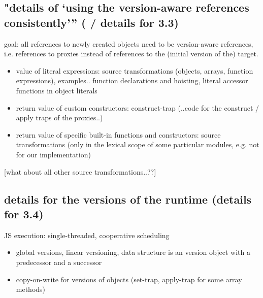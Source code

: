 \subsection{"details of ‘using the version-aware references consistently’” ( / details for 3.3)}

goal: all references to newly created objects need to be version-aware references, i.e. references to proxies instead of references to the (initial version of the) target. 

\begin{itemize}
    \item value of literal expressions: source transformations (objects, arrays, function expressions), examples.. function declarations and hoisting, literal accessor functions in object literals
    \item return value of custom constructors: construct-trap (..code for the construct / apply traps of the proxies..)
    \item return value of specific built-in functions and constructors: source transformations (only in the lexical scope of some particular modules, e.g. not for our implementation)
\end{itemize}

[what about all other source transformations..??]




\subsection{details for the versions of the runtime (details for 3.4)}

JS execution: single-threaded, cooperative scheduling 

\begin{itemize}
    \item global versions, linear versioning, data structure is an version object with a predecessor and a successor
    \item copy-on-write for versions of objects (set-trap, apply-trap for some array methods)
\end{itemize}


